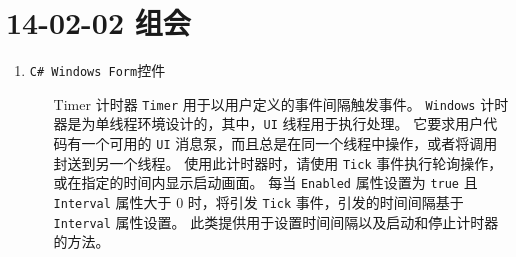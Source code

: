 \documentclass[]{report}
\begin{document}
\section{14-02-02 组会}
\begin{enumerate}
		\item \verb|C# Windows Form|控件
		\begin{itemize}
			\item[Timer] 计时器
			\verb|Timer| 用于以用户定义的事件间隔触发事件。 \verb|Windows| 计时器是为单线程环境设计的，其中，\verb|UI| 线程用于执行处理。 它要求用户代码有一个可用的 \verb|UI| 消息泵，而且总是在同一个线程中操作，或者将调用封送到另一个线程。
			使用此计时器时，请使用 \verb|Tick| 事件执行轮询操作，或在指定的时间内显示启动画面。 每当 \verb|Enabled| 属性设置为 \verb|true| 且 \verb|Interval| 属性大于 $0$ 时，将引发 \verb|Tick| 事件，引发的时间间隔基于 \verb|Interval| 属性设置。
			此类提供用于设置时间间隔以及启动和停止计时器的方法。
		\end{itemize}
\end{enumerate}
\end{document}
